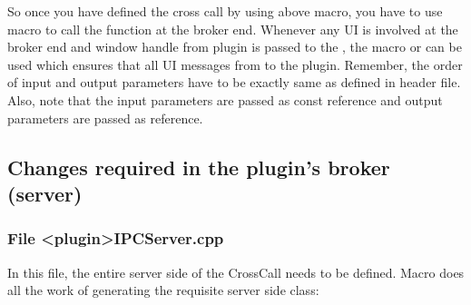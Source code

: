 \documentclass[letterpaper,12pt,english,openany,oneside]{sphinxmanual}
\begin{document}
\begin{sphinxVerbatim}[commandchars=\\\{\}]
  
\end{sphinxVerbatim}

So once you have defined the cross call by using above macro, you have to use macro  to call the function at the broker end. Whenever any UI is involved at the broker end and window handle from plugin is passed to the  , the macro  or  can be used which ensures that all UI messages from  to the plugin. Remember, the order of input and output parameters have to be exactly same as defined in  header file. Also, note that the input parameters are passed as const reference and output parameters are passed as reference.

\begin{sphinxVerbatim}[commandchars=\\\{\}]
   

      
\end{sphinxVerbatim}


\subsection{Changes required in the plugin’s broker (server)}
\label{\detokenize{SandboxBrokerExt:changes-required-in-the-plugin-s-broker-server}}

\subsubsection{File <plugin>IPCServer.cpp}
\label{\detokenize{SandboxBrokerExt:file-plugin-ipcserver-cpp}}
In this file, the entire server side of the CrossCall needs to be defined. Macro  does all the work of generating the requisite server side class:
\end{document}
